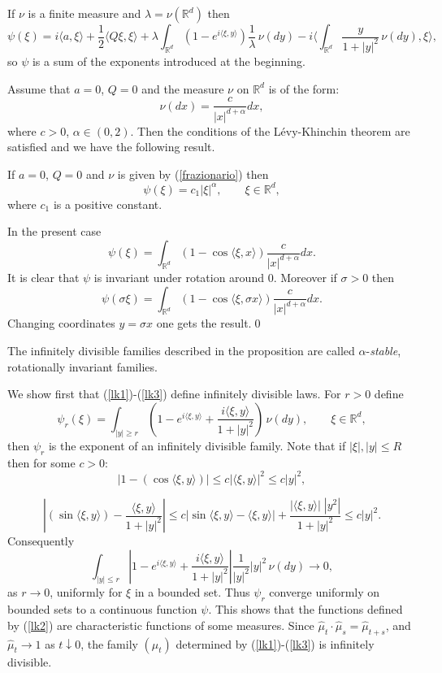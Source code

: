 \documentclass[preprint]{imsart}
\def\R{\mathbb R}
\begin{document}
{

 If $\nu$ is a finite measure
and $\lambda =\nu(\R^d)$ then
$$\psi(\xi)=i\langle a,\xi\rangle
+\frac{1}{2}\langle Q\xi ,\xi\rangle +
\lambda \int_{\R^d}\left(1-e^{i\langle \xi,y\rangle}
\right)\frac{1}{\lambda}\,
\nu(dy)
-i\langle
 \int_{\R^d}
\frac{y}{1+|y|^2}\,
\nu(dy),\xi\rangle,
$$
so $\psi$ is a sum of the exponents introduced at the
beginning.

 Assume that $a=0$, $Q=0$ and the measure $\nu$ on $\R^d$ is of the form:
\begin{equation}\label{frazionario}
\nu(dx) =\frac{c}{|x|^{d+\alpha}}dx,
\end{equation}
where $c>0$, $\alpha\in (0,2)$. Then the conditions of
the L\'evy-Khinchin theorem are satisfied and we have the following result.

\begin{Proposition}\label{frazion}
If $a=0$, $Q=0$ and   $\nu$ is given by
(\ref{frazionario}) then
$$
\psi (\xi)=c_1|\xi|^\alpha,\qquad\xi\in\R^d,
$$
where $c_1$ is a positive constant.
\end{Proposition}

In the present case
$$
\psi (\xi)=\int_{\R^d}
\left(1-\cos \langle \xi, x\rangle\right)
\frac{c}{|x|^{d+\alpha}}dx.
$$
It is clear that $\psi$ is invariant under rotation
around $0$. Moreover if $\sigma >0$ then
$$
\psi (\sigma\xi)=\int_{\R^d}
\left(1-\cos \langle \xi, \sigma x\rangle\right)
\frac{c}{|x|^{d+\alpha}}dx.
$$
Changing coordinates $y=\sigma x$ one gets the
result.\qed

\noindent The infinitely divisible families described in the
proposition are called $\alpha$-{\it stable}, rotationally invariant families.

We show first that (\ref{lk1})-(\ref{lk3}) define
infinitely divisible laws. For $r>0$ define
$$
\psi_r(\xi)=
\int_{|y|\geq r}\left(1-e^{i\langle \xi,y\rangle}+
\frac{i\langle \xi,y\rangle}{1+|y|^2}\right)\,
\nu(dy),\qquad \xi\in\R^d,
$$
then $\psi_r$ is the exponent of an infinitely
divisible family. Note that if $|\xi|,|y|\leq R$ then
for some $c>0$:
$$
\left| 1-(\cos \langle\xi,y\rangle)\right|
\leq c |\langle\xi,y\rangle|^2\leq c|y|^2,
$$

$$
\left|  (\sin \langle\xi,y\rangle)
-\frac{\langle\xi,y\rangle}{1+|y|^2}
\right|
\leq c |\sin \langle\xi,y\rangle-\langle\xi,y\rangle|
+\frac{|\langle\xi,y\rangle |\; |y^2|}{1+|y|^2}
\leq c |y|^2.
$$
Consequently
$$
\int_{|y|\leq r}\left|1-e^{i\langle \xi,y\rangle}+
\frac{i\langle \xi,y\rangle}{1+|y|^2}\right|
\frac{1}{|y|^2}|y|^2\,
\nu(dy)\to 0,
$$
as $r\to 0$, uniformly for $\xi$ in a bounded set. Thus
$\psi_r$ converge uniformly on bounded sets to a
continuous function $\psi$. This shows that the
functions defined by (\ref{lk2}) are characteristic
functions of some measures. Since $\widehat{\mu}_t\cdot
\widehat{\mu}_s=
\widehat{\mu}_{t+s}$, and $\widehat{\mu}_t\to 1$ as
$t\downarrow 0$, the family $(\mu_t)$ determined by
(\ref{lk1})-(\ref{lk3}) is infinitely divisible.


}
\end{document}
